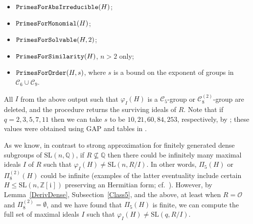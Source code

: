 \documentclass[11pt]{amsart}
\theoremstyle{definition}
\theoremstyle{remark}
\newcommand{\Z}{\mathbb{Z}}
\newcommand{\Q}{\mathbb{Q}}
\newcommand{\SL}{\mathrm{SL}}
\newcommand{\calc}{\mathscr{C}}
\begin{document}
\begin{itemize}
\item ${\tt PrimesForAbsIrreducible}(H)$;

\vspace{3pt}

\item ${\tt PrimesForMonomial}(H)$;

\vspace{3pt}

\item ${\tt PrimesForSolvable}(H, 2)$;

\vspace{3pt}

\item ${\tt PrimesForSimilarity}(H)$, $n>2$ only;

\vspace{3pt}

\item ${\tt PrimesForOrder}(H, s)$, where $s$ is a bound on the
 exponent of groups in $\calc_6 \cup \calc_9$.
\end{itemize}

\vspace{7.5pt}

\noindent All $I$ from the above output such that $\varphi_I(H)$ 
is a $\mathscr{C}_5$-group or $\mathscr{C}_8^{(2)}$-group are 
deleted, and the procedure returns the surviving ideals of $R$. 
Note that if $q = 2,3,\allowbreak  5,\allowbreak 7,11$ then we 
can take $s$ to be $10, 21, 60, 84, 253$, respectively, by 
\cite[Remark~3.3]{ExpMath}; these values were obtained using {\sf GAP}
 and tables in \cite[Chapter~8]{Brayetal}.

As we know, in contrast to strong approximation for finitely generated
dense subgroups of $\SL(n,\Q)$, if $R \not \subseteq \Q$ 
then there could be infinitely many maximal ideals $I$
of $R$ such that $\varphi_I(H)\neq \SL(n,R/I)$. In other
words, $\Pi_5(H)$ or $\Pi_8^{(2)}(H)$ could be infinite (examples 
of the latter eventuality include certain 
$H\leq \SL(n,\Z[\hspace{1pt}\mathrm{i}\hspace{1pt}])$ 
preserving an Hermitian form; cf.~\cite[Section~5]{Bridson}).
However, by Lemma~\ref{DerivDense}, Subsection~\ref{Class5}, and
the above,
at least when $R=\mathcal{O}$ and $\Pi_8^{(2)}=\emptyset$, and 
we have found that $\Pi_5(H)$ is finite, we can compute the full 
set of maximal ideals $I$ such that $\varphi_I(H) \neq \SL(q,R/I)$. 
\end{document}

